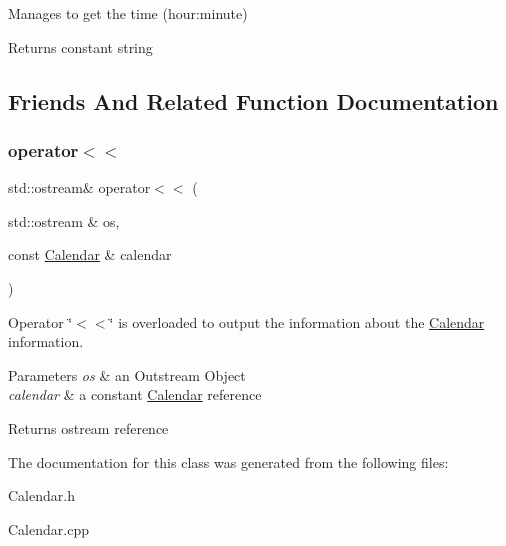 Manages to get the time (hour\+:minute) 

\begin{DoxyReturn}{Returns}
constant string 
\end{DoxyReturn}


\subsection{Friends And Related Function Documentation}
\mbox{\label{class_calendar_a4b8b43dc4ffd8338cb542043292b5231}} 
\subsubsection{\texorpdfstring{operator$<$$<$}{operator<<}}
{\footnotesize\ttfamily std\+::ostream\& operator$<$$<$ (\begin{DoxyParamCaption}\item[{std\+::ostream \&}]{os,  }\item[{const \hyperlink{class_calendar}{Calendar} \&}]{calendar }\end{DoxyParamCaption})\hspace{0.3cm}{\ttfamily [friend]}}



Operator \char`\"{}$<$$<$\char`\"{} is overloaded to output the information about the \hyperlink{class_calendar}{Calendar} information. 


\begin{DoxyParams}{Parameters}
{\em os} & an Outstream Object \\
\hline
{\em calendar} & a constant \hyperlink{class_calendar}{Calendar} reference \\
\hline
\end{DoxyParams}
\begin{DoxyReturn}{Returns}
ostream reference 
\end{DoxyReturn}


The documentation for this class was generated from the following files\+:\begin{DoxyCompactItemize}
\item 
Calendar.\+h\item 
Calendar.\+cpp\end{DoxyCompactItemize}
